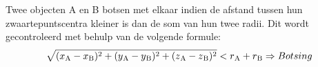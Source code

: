 Twee objecten A en B botsen met elkaar indien de afstand tussen hun zwaartepuntscentra kleiner is dan de som van hun twee radii. Dit wordt gecontroleerd met behulp van de volgende formule:
\begin{equation*}
\sqrt{(x\textsubscript{A}-x\textsubscript{B})\textsuperscript{2} + (y\textsubscript{A} - y\textsubscript{B})\textsuperscript{2} + (z\textsubscript{A} - z\textsubscript{B})\textsuperscript{2}}  < r\textsubscript{A} + r\textsubscript{B} \Rightarrow Botsing
\end{equation*}
